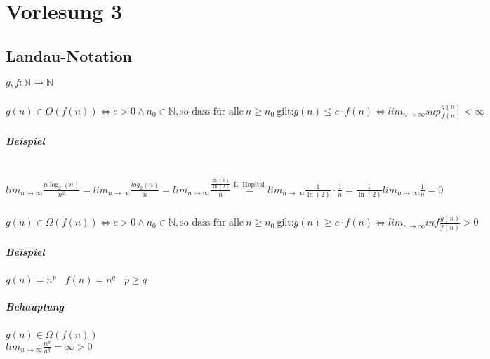 \chapter{Vorlesung 3}


\section{Landau-Notation}

$g, f : \mathbb{N} \rightarrow \mathbb{N}$

\subsection{}
$g(n) \in O(f(n)) \Leftrightarrow c > 0 \land n_0 \in \mathbb{N}, \text{so dass für alle}~n \geq n_0~\text{gilt:} g(n) \leq c \cdot f(n) \Leftrightarrow lim_{n \rightarrow \infty} sup \frac{g(n)}{f(n)} < \infty$
\paragraph{Beispiel} \text{} \\
$lim_{n \rightarrow \infty} \frac{n \log_2(n)}{n^2} = lim_{n \rightarrow \infty} \frac{log_2(n)}{n} = lim_{n \rightarrow \infty} \frac{\frac{\ln(n)}{\ln(2)}}{n} \stackrel{\text{L' Hopital}}{=} lim_{n \rightarrow \infty} \frac{1}{\ln(2)} \cdot \frac{1}{n} = \frac{1}{\ln(2)} lim_{n \rightarrow \infty} \frac{1}{n} = 0$\\



\subsection{}
$g(n) \in \Omega(f(n)) \Leftrightarrow c > 0 \land n_0 \in \mathbb{N}, \text{so dass für alle}~n \geq n_0~\text{gilt:} g(n) \geq c \cdot f(n) \Leftrightarrow lim_{n \rightarrow \infty} inf \frac{g(n)}{f(n)} > 0$
\paragraph{Beispiel} $g(n) = n^p~~~~f(n)=n^q~~~~p \geq q$
\paragraph{Behauptung} $g(n) \in \Omega(f(n))$\\

$lim_{n \rightarrow \infty} \frac{n^p}{n^q} = \infty > 0$\\


